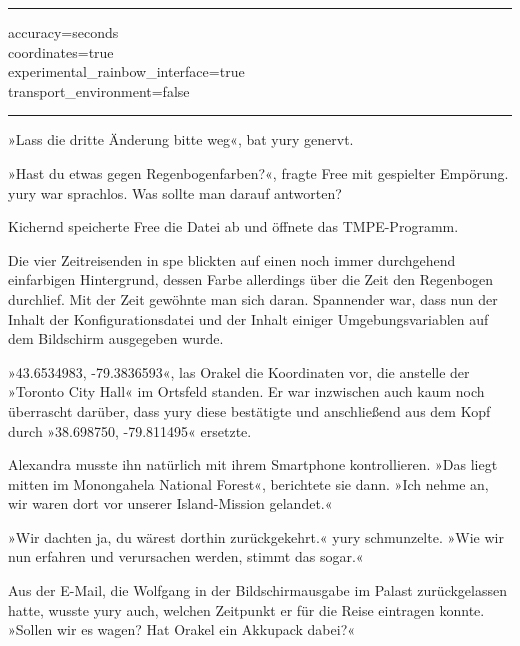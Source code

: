 \noindent \parbox{\textwidth}{ \vspace{3ex} \hrule \vspace{3ex}

    \begin{footnotesize}
    \begin{ttfamily}

\noindent accuracy=seconds\\
\noindent coordinates=true\\
\noindent experimental\_rainbow\_interface=true\\
\noindent transport\_environment=false

    \end{ttfamily}
    \end{footnotesize}

\vspace{3ex} \hrule \vspace{3ex} }

»Lass die dritte Änderung bitte weg«, bat yury genervt.

»Hast du etwas gegen Regenbogenfarben?«, fragte Free mit gespielter Empörung. yury war sprachlos. Was sollte man darauf antworten?

Kichernd speicherte Free die Datei ab und öffnete das TMPE-Programm.

Die vier Zeitreisenden in spe blickten auf einen noch immer durchgehend einfarbigen Hintergrund, dessen Farbe allerdings über die Zeit den Regenbogen durchlief. Mit der Zeit gewöhnte man sich daran. Spannender war, dass nun der Inhalt der Konfigurationsdatei und der Inhalt einiger Umgebungsvariablen auf dem Bildschirm ausgegeben wurde.

»43.6534983, -79.3836593«, las Orakel die Koordinaten vor, die anstelle der »Toronto City Hall« im Ortsfeld standen. Er war inzwischen auch kaum noch überrascht darüber, dass yury diese bestätigte und anschließend aus dem Kopf durch »38.698750, -79.811495« ersetzte.

Alexandra musste ihn natürlich mit ihrem Smartphone kontrollieren. »Das liegt mitten im Monongahela National Forest«, berichtete sie dann. »Ich nehme an, wir waren dort vor unserer Island-Mission gelandet.«

»Wir dachten ja, du wärest dorthin zurückgekehrt.« yury schmunzelte. »Wie wir nun erfahren und verursachen werden, stimmt das sogar.«

Aus der E-Mail, die Wolfgang in der Bildschirmausgabe im Palast zurückgelassen hatte, wusste yury auch, welchen Zeitpunkt er für die Reise eintragen konnte. »Sollen wir es wagen? Hat Orakel ein Akkupack dabei?«

